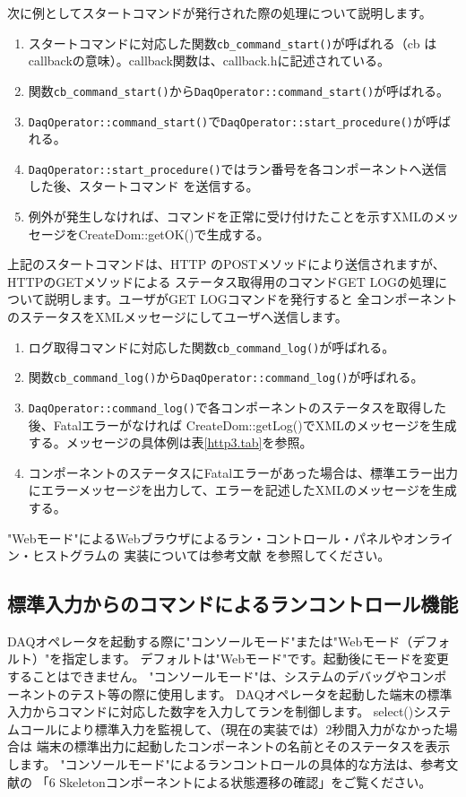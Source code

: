 \documentclass[a4j,10pt,dvips,onecolumn,oneside,final]{jarticle}%
\begin{document}
次に例としてスタートコマンドが発行された際の処理について説明します。
\begin{enumerate}
\item スタートコマンドに対応した関数\verb|cb_command_start()|が呼ばれる（cb はcallbackの意味）。callback関数は、callback.hに記述されている。
\item 関数\verb|cb_command_start()|から\verb|DaqOperator::command_start()|が呼ばれる。
\item \verb|DaqOperator::command_start()|で\verb|DaqOperator::start_procedure()|が呼ばれる。
\item \verb|DaqOperator::start_procedure()|ではラン番号を各コンポーネントへ送信した後、スタートコマンド
を送信する。
\item 例外が発生しなければ、コマンドを正常に受け付けたことを示すXMLのメッセージをCreateDom::getOK()で生成する。
\end{enumerate}

上記のスタートコマンドは、HTTP のPOSTメソッドにより送信されますが、HTTPのGETメソッドによる
ステータス取得用のコマンドGET LOGの処理について説明します。ユーザがGET LOGコマンドを発行すると
全コンポーネントのステータスをXMLメッセージにしてユーザへ送信します。

\begin{enumerate}
\item ログ取得コマンドに対応した関数\verb|cb_command_log()|が呼ばれる。
\item 関数\verb|cb_command_log()|から\verb|DaqOperator::command_log()|が呼ばれる。
\item \verb|DaqOperator::command_log()|で各コンポーネントのステータスを取得した後、Fatalエラーがなければ CreateDom::getLog()でXMLのメッセージを生成する。メッセージの具体例は表\ref{http3.tab}を参照。
\item コンポーネントのステータスにFatalエラーがあった場合は、標準エラー出力にエラーメッセージを出力して、エラーを記述したXMLのメッセージを生成する。
\end{enumerate}

"Webモード"によるWebブラウザによるラン・コントロール・パネルやオンライン・ヒストグラムの
実装については参考文献 \cite{Web-GUI}を参照してください。

\subsection{標準入力からのコマンドによるランコントロール機能}\label{cons-mode}
DAQオペレータを起動する際に"コンソールモード"または"Webモード（デフォルト）"を指定します。
デフォルトは"Webモード"です。起動後にモードを変更することはできません。
"コンソールモード"は、システムのデバッグやコンポーネントのテスト等の際に使用します。
DAQオペレータを起動した端末の標準入力からコマンドに対応した数字を入力してランを制御します。
select()システムコールにより標準入力を監視して、（現在の実装では）2秒間入力がなかった場合は
端末の標準出力に起動したコンポーネントの名前とそのステータスを表示します。
"コンソールモード"によるランコントロールの具体的な方法は、参考文献\cite{COMP-DEV}の
「6 Skeletonコンポーネントによる状態遷移の確認」をご覧ください。
\end{document}

